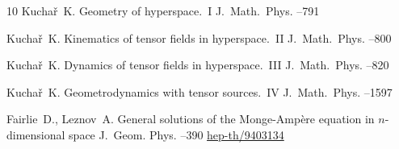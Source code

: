 \begin{thebibliography}{10}
\by Kucha\v{r}~K. 
\paper Geometry of hyperspace.~I 
\jour J.~Math.~Phys.
--791

\by Kucha\v{r}~K. 
\paper Kinematics of tensor fields in hyperspace.~II 
\jour J.~Math.~Phys.
--800

\by Kucha\v{r}~K. 
\paper Dynamics of tensor fields in hyperspace.~III 
\jour J.~Math.~Phys.
--820 

\by Kucha\v{r}~K. 
\paper Geometrodynamics with tensor sources.~IV
\jour J.~Math.~Phys.
--1597



\by Fairlie~D.,  Leznov~A.
\paper General solutions of the Monge-Amp\`ere equation in $n$-dimensional space
\jour J.~Geom. Phys.
--390 
\arxiv \href{http://arxiv.org/abs/hep-th/9403134}{hep-th/9403134}
 

\end{thebibliography}

\EngDate	


\newpage
\Russian


%
%
%
%

